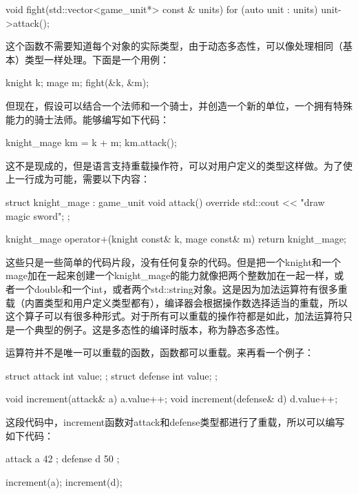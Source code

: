 \begin{cpp}
void fight(std::vector<game_unit*> const & units)
{
	for (auto unit : units)
	{
		unit->attack();
	}
}
\end{cpp}

这个函数不需要知道每个对象的实际类型，由于动态多态性，可以像处理相同（基本）类型一样处理。下面是一个用例：

\begin{cpp}
knight k;
mage m;
fight({&k, &m});
\end{cpp}

但现在，假设可以结合一个法师和一个骑士，并创造一个新的单位，一个拥有特殊能力的骑士法师。能够编写如下代码：

\begin{cpp}
knight_mage km = k + m;
km.attack();
\end{cpp}

这不是现成的，但是语言支持重载操作符，可以对用户定义的类型这样做。为了使上一行成为可能，需要以下内容：

\begin{cpp}
struct knight_mage : game_unit
{
	void attack() override
	{ std::cout << "draw magic sword\n"; }
};

knight_mage operator+(knight const& k, mage const& m)
{
	return knight_mage{};
}
\end{cpp}

这些只是一些简单的代码片段，没有任何复杂的代码。但是把一个knight和一个mage加在一起来创建一个knight\_mage的能力就像把两个整数加在一起一样，或者一个double和一个int，或者两个std::string对象。这是因为加法运算符有很多重载（内置类型和用户定义类型都有），编译器会根据操作数选择适当的重载，所以这个算子可以有很多种形式。对于所有可以重载的操作符都是如此，加法运算符只是一个典型的例子。这是多态性的编译时版本，称为静态多态性。

运算符并不是唯一可以重载的函数，函数都可以重载。来再看一个例子：

\begin{cpp}
struct attack { int value; };
struct defense { int value; };

void increment(attack& a) { a.value++; }
void increment(defense& d) { d.value++; }
\end{cpp}

这段代码中，increment函数对attack和defense类型都进行了重载，所以可以编写如下代码：

\begin{cpp}
attack a{ 42 };
defense d{ 50 };

increment(a);
increment(d);
\end{cpp}

